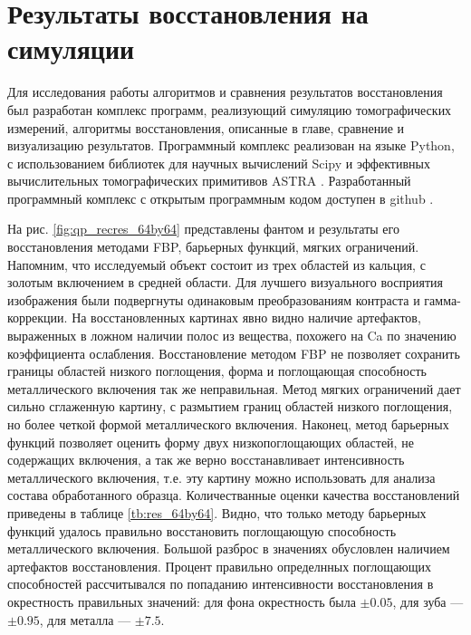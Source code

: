 \section{Результаты восстановления на симуляции}
Для исследования работы алгоритмов и сравнения результатов восстановления был разработан комплекс программ, реализующий симуляцию томографических измерений, алгоритмы восстановления, описанные в главе, сравнение и визуализацию результатов.
Программный комплекс реализован на языке Python, с использованием библиотек для научных вычислений Scipy \cite{scipy} и эффективных вычислительных томографических примитивов ASTRA \cite{van2015astra}.
Разработанный программный комплекс с открытым программным кодом доступен в github \cite{whitomo}.

На рис. \ref{fig:qp_recres_64by64} представлены фантом и  результаты его восстановления методами FBP, барьерных функций, мягких ограничений. 
Напомним, что исследуемый объект состоит из трех областей из кальция, с золотым включением в средней области.
Для лучшего визуального восприятия изображения были подвергнуты одинаковым преобразованиям контраста и гамма-коррекции.
На восстановленных картинах явно видно наличие артефактов, выраженных в ложном наличии полос из вещества, похожего на Ca по значению коэффициента ослабления.
Восстановление методом FBP не позволяет сохранить границы областей низкого поглощения, форма и поглощающая способность металлического включения так же неправильная.
Метод мягких ограничений дает сильно сглаженную картину, с размытием границ областей низкого поглощения, но более четкой формой металлического включения.
Наконец, метод барьерных функций позволяет оценить форму двух низкопоглощающих областей, не содержащих включения, а так же верно восстанавливает интенсивность металлического включения, т.е. эту картину можно использовать для анализа состава обработанного образца.
Количестванные оценки качества восстановлений приведены в таблице \ref{tb:res_64by64}.
Видно, что только методу барьерных функций удалось правильно восстановить поглощающую способность металлического включения.
Большой разброс в значениях обусловлен наличием артефактов восстановления.
Процент правильно определнных поглощающих способностей рассчитывался по попаданию интенсивности восстановления в окрестность правильных значений: для фона окрестность была $\pm 0.05$, для зуба --- $\pm 0.95$, для металла --- $\pm 7.5$.

